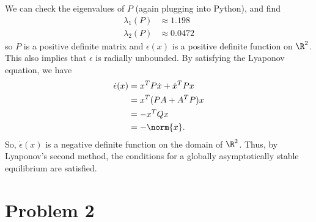 \documentclass{homework}
\begin{document}
We can check the eigenvalues of $P$ (again plugging into Python), and find
\begin{align*}
    \lambda_1(P) &\approx 1.198 \\
    \lambda_2(P) &\approx 0.0472
\end{align*}
so $P$ is a positive definite matrix and $\epsilon(x)$ is a positive definite
function on $\R^2$. This also implies that $\epsilon$ is radially unbounded. By satisfying
the Lyaponov equation, we have
\begin{align*}
    \dot{\epsilon}(x) &= x^T P \dot{x} + \dot{x}^T P x  \\
        &= x^T (PA + A^T P) x \\
        &= - x^T Q x \\
        &= - \norm{x}.
\end{align*}
So, $\dot{\epsilon}(x)$ is a negative definite function on the domain of $\R^2$.
Thus, by Lyaponov's second method, the conditions for a globally asymptotically
stable equilibrium are satisfied.

\section{Problem 2}
\end{document}
